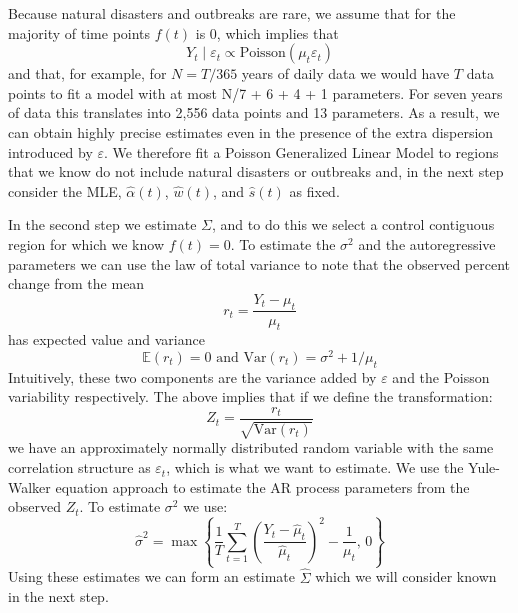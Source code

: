 \documentclass[11pt]{article}
\begin{document}
Because natural disasters and outbreaks are rare, we assume that for the majority of time points $f(t)$ is 0, which implies that 
\begin{equation*}
    Y_t \mid \varepsilon_t \propto \mbox{Poisson}(\mu_t  \varepsilon_t )
\end{equation*}
and that, for example, for $N = T / 365$ years of daily data we would have $T$ data points to fit a model with at most N/7 + 6 + 4 + 1 parameters. For seven years of data this translates into 2,556 data points and 13 parameters. As a result, we can obtain highly precise estimates even in the presence of the extra dispersion introduced by $\varepsilon$. We therefore fit a Poisson Generalized Linear Model to regions that we know do not include natural disasters or outbreaks and, in the next step consider the MLE, $\hat{\alpha}(t)$, $\hat{w}(t)$, and $\hat{s}(t)$ as fixed.

In the second step we estimate $\Sigma$, and to do this we select a control contiguous region for which we know $f(t)=0$. To estimate the $\sigma^2$ and the autoregressive parameters we can use the law of total variance to note that the observed percent change from the mean
\begin{equation*}
    r_t = \frac{Y_t - \mu_t}{\mu_t}
\end{equation*}
has expected value and variance
\begin{equation*}
    \mathbb{E}\left(r_t \right) = 0 \mbox{ and } \mbox{Var}\left(r_t\right)= \sigma^2 + 1/\mu_t
\end{equation*}
Intuitively, these two components are the variance added by $\varepsilon$ and the Poisson variability respectively. The above implies that if we define the transformation:
\begin{equation*}
    Z_t = \frac{r_t}{\sqrt{\mbox{Var}\left(r_t\right)}}
\end{equation*}
we have an approximately normally distributed random variable with the same correlation structure as $\varepsilon_t$, which is what we want to estimate. We use the Yule-Walker equation approach to estimate the AR process parameters from the observed $Z_t$. To estimate $\sigma^2$ we use:
\begin{equation*}
    \hat{\sigma}^2 = \max\left\{ \frac{1}{T}\sum_{t=1}^T  \left(\frac{Y_t - \hat{\mu}_t}{\hat{\mu}_t}\right)^2  - \frac{1}{\mu_t}, \, 0\right\}
\end{equation*}
Using these estimates we can form an estimate $\hat{\Sigma}$ which we will consider known in the next step.
\end{document}

